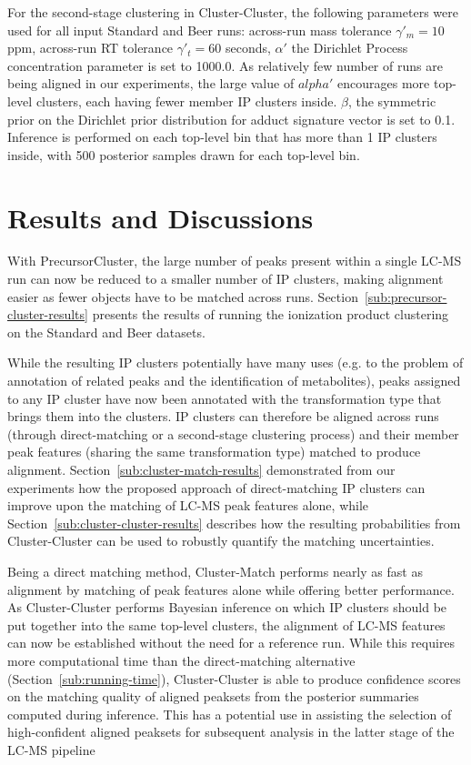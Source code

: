 For the second-stage clustering in Cluster-Cluster, the following parameters were used for all input Standard and Beer runs: across-run mass tolerance $\gamma'_m=10$ ppm, across-run RT tolerance $\gamma'_t=60$ seconds, $\alpha'$ the Dirichlet Process concentration parameter is set to 1000.0. As relatively few number of runs are being aligned in our experiments, the large value of $alpha'$ encourages more top-level clusters, each having fewer member IP clusters inside.  $\beta$, the symmetric prior on the Dirichlet prior distribution for adduct signature vector is set to 0.1. Inference is performed on each top-level bin that has more than 1 IP clusters inside, with 500 posterior samples drawn for each top-level bin.

\section{Results and Discussions}

With PrecursorCluster, the large number of peaks present within a single LC-MS run can now be reduced to a smaller number of IP clusters, making alignment easier as fewer objects have to be matched across runs. Section~\ref{sub:precursor-cluster-results} presents the results of running the ionization product clustering on the Standard and Beer datasets. 

While the resulting IP clusters potentially have many uses (e.g. to the problem of annotation of related peaks and the identification of metabolites), peaks assigned to any IP cluster have now been annotated with the transformation type that brings them into the clusters. IP clusters can therefore be aligned across runs (through direct-matching or a second-stage clustering process) and their member peak features (sharing the same transformation type) matched to produce alignment. Section~\ref{sub:cluster-match-results} demonstrated from our experiments how the proposed approach of direct-matching IP clusters can improve upon the matching of LC-MS peak features alone, while Section~\ref{sub:cluster-cluster-results} describes how the resulting probabilities from Cluster-Cluster can be used to robustly quantify the matching uncertainties.

Being a direct matching method, Cluster-Match performs nearly as fast as alignment by matching of peak features alone while offering better performance. As Cluster-Cluster performs Bayesian inference on which IP clusters should be put together into the same top-level clusters, the alignment of LC-MS features can now be established without the need for a reference run. While this requires more computational time than the direct-matching alternative (Section~\ref{sub:running-time}), Cluster-Cluster is able to produce confidence scores on the matching quality of aligned peaksets from the posterior summaries computed during inference. This has a potential use in assisting the selection of high-confident aligned peaksets for subsequent analysis in the latter stage of the LC-MS pipeline

